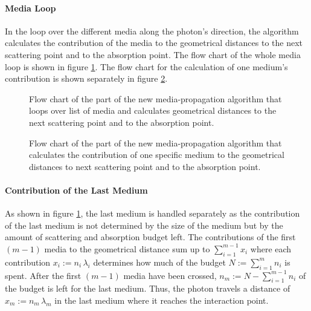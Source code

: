 
\paragraph{Media Loop}
In the loop over the different media along the photon's direction, the algorithm calculates the contribution of the media to the geometrical distances to the next scattering point and to the absorption point.
The flow chart of the whole media loop is shown in figure \ref{fig:nimuriX4}. The flow chart for the calculation of one medium's contribution is shown separately in figure \ref{fig:eewoo3Be}.

\begin{figure}[p]
  \resizebox{\textwidth}{!}{%
    
  }
  \vspace*{5mm}
  \caption{Flow chart of the part of the new media-propagation algorithm that loops over list of media and calculates geometrical distances to the next scattering point and to the absorption point.}
  \label{fig:nimuriX4}
\end{figure}


\begin{figure}[htbp]
  \caption{Flow chart of the part of the new media-propagation algorithm that calculates the contribution of one specific medium to the geometrical distances to next scattering point and to the absorption point.}
  \label{fig:eewoo3Be}
\end{figure}

\paragraph{Contribution of the Last Medium}
As shown in figure \ref{fig:nimuriX4}, the last medium is handled separately as the contribution of the last medium is not determined by the size of the medium but by the amount of scattering and absorption budget left.
The contributions of the first $(m-1)$ media to the geometrical distance sum up to $\sum_{i=1}^{m-1} x_i$ where each contribution $x_i := n_i\,\lambda_i$ determines how much of the budget $N:=\sum_{i=1}^m n_i$ is spent. After the first $(m-1)$ media have been crossed, $n_m := N - \sum_{i=1}^{m-1} n_i$ of the budget is left for the last medium. Thus, the photon travels a distance of $x_m := n_m\,\lambda_m$ in the last medium where it reaches the interaction point.

